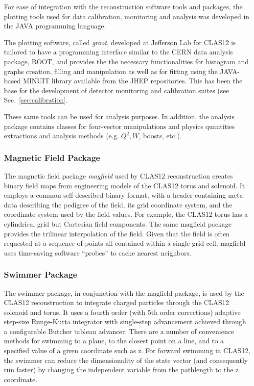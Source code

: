 For ease of integration with the reconstruction software tools and packages, the plotting tools used for data
calibration, monitoring and analysis was developed in the JAVA programming language.

The plotting software, called {\it groot}, developed at Jefferson Lab for CLAS12 is tailored to have a programming
interface similar to the CERN data analysis package, ROOT, and provides the the necessary functionalities for histogram and graphs creation, filling and manipulation as well as for fitting using the JAVA-based MINUIT library available from the JHEP repositories. This has been the base for the development of detector monitoring and calibration suites (see Sec.~\ref{sec:calibration}.

These same tools can be used for analysis purposes. In addition, the analysis package contains classes for four-vector manipulations and physics quantities extractions and
analysis methods (e.g. $Q^2, W$, boosts, etc.).

\subsubsection{Magnetic Field Package}
The magnetic field package {\it magfield} used by CLAS12 reconstruction creates
binary field maps from engineering models of the CLAS12 torus and solenoid. It employs
a common self-described binary format, with a header containing meta-data describing
the pedigree of the field, its grid coordinate system, and the coordinate system
used by the field values. For example, the CLAS12 torus has a cylindrical grid
but Cartesian field components. The same magfield package provides the trilinear
interpolation of the field. Given that the field is often requested at a sequence
of points all contained within a single grid cell, magfield uses time-saving
software “probes” to cache nearest neighbors.

\subsubsection{Swimmer Package}
The swimmer package, in conjunction with the magfield package, is used by the CLAS12
reconstruction to integrate charged particles through the CLAS12 solenoid and torus.
It uses a fourth order (with 5th order corrections) adaptive step-size Runge-Kutta integrator
with single-step advancement achieved through a configurable Butcher tableau advancer.
There are a number of convenience methods for swimming to a plane, to the closest
point on a line, and to a specified value of a given coordinate such as z. For
forward swimming in CLAS12, the swimmer can reduce the dimensionality of the state
vector (and consequently run faster) by changing the independent variable from
the pathlength to the z coordinate.

